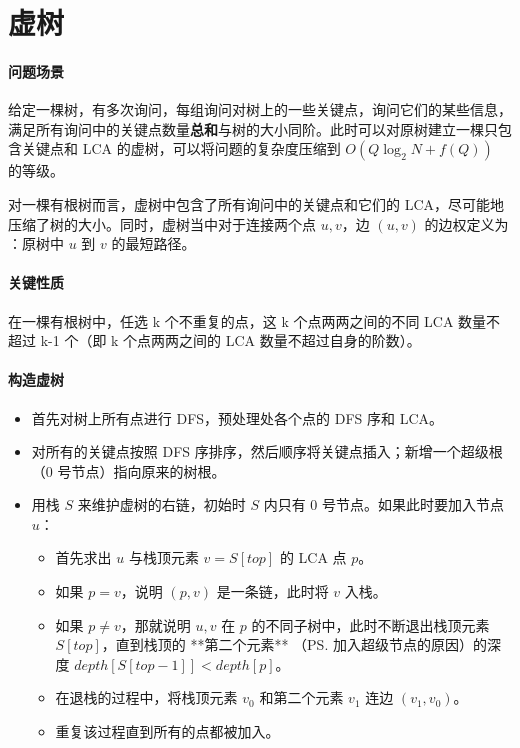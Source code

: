 \section{虚树}

\paragraph{问题场景}

\par 给定一棵树，有多次询问，每组询问对树上的一些关键点，询问它们的某些信息，满足所有询问中的关键点数量\textbf{总和}与树的大小同阶。此时可以对原树建立一棵只包含关键点和 LCA 的虚树，可以将问题的复杂度压缩到 $O(Q \log_2N + f(Q))$ 的等级。

\par 对一棵有根树而言，虚树中包含了所有询问中的关键点和它们的 LCA，尽可能地压缩了树的大小。同时，虚树当中对于连接两个点 $u, v$，边 $(u, v)$ 的边权定义为 ：原树中 $u$ 到 $v$ 的最短路径。

\paragraph{关键性质}

\par 在一棵有根树中，任选 k 个不重复的点，这 k 个点两两之间的不同 LCA 数量不超过 k-1 个（即 k 个点两两之间的 LCA 数量不超过自身的阶数）。

\paragraph{构造虚树}

\begin{itemize}
    \item 首先对树上所有点进行 DFS，预处理处各个点的 DFS 序和 LCA。
    \item 对所有的关键点按照 DFS 序排序，然后顺序将关键点插入；新增一个超级根 （0 号节点）指向原来的树根。
    \item 用栈 $S$ 来维护虚树的右链，初始时  $S$ 内只有 $0$ 号节点。如果此时要加入节点 $u$：
    \begin{itemize}
        \item 首先求出 $u$ 与栈顶元素 $v = S[top]$ 的 LCA 点 $p$。
        \item 如果 $p = v$，说明 $(p, v)$ 是一条链，此时将 $v$ 入栈。
        \item 如果 $p \neq v$，那就说明 $u, v$ 在 $p$ 的不同子树中，此时不断退出栈顶元素 $S[top]$，直到栈顶的 **第二个元素** （PS. 加入超级节点的原因）的深度 $depth[S[top-1]] < depth[p]$。
        \item 在退栈的过程中，将栈顶元素 $v_0$ 和第二个元素 $v_1$ 连边 $(v_1, v_0)$。
        \item 重复该过程直到所有的点都被加入。
    \end{itemize}
\end{itemize}

